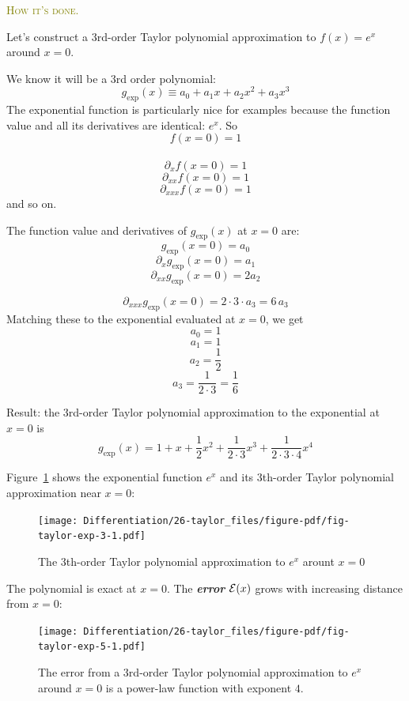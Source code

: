 \documentclass[
  letterpaper,
  DIV=11,
  numbers=noendperiod,
  oneside]{scrreprt}
\newenvironment{practice}%
{%
\textcolor{olive}{\hrulefill}%
  \par\vspace{.3\baselineskip}%
  \textcolor{olive}{\scshape How it's done.}%
  \par\vspace{\baselineskip}%
}%
{\textcolor{olive}{\hrulefill}}
\begin{document}
\begin{practice}
Let's construct a 3rd-order Taylor polynomial approximation to
\(f(x) = e^x\) around \(x=0\).

We know it will be a 3rd order polynomial:
\[g_{\exp}(x) \equiv a_0 + a_1 x + a_2 x^2 + a_3 x^3\] The exponential
function is particularly nice for examples because the function value
and all its derivatives are identical: \(e^x\). So \[f(x= 0) = 1\]\\
\[ \partial_x f(x=0) = 1\] \[\partial_{xx} f(x=0) = 1\]
\[\partial_{xxx} f(x=0) = 1\] and so on.

The function value and derivatives of \(g_{\exp}(x)\) at \(x=0\) are:
\[g_{\exp}(x=0) = a_0\] \[\partial_{x}g_{\exp}(x=0) = a_1\]
\[\partial_{xx}g_{\exp}(x=0) = 2 a_2\]

\[\partial_{xxx}g_{\exp}(x=0) = 2\cdot3\cdot a_3 = 6\, a_3\] Matching
these to the exponential evaluated at \(x=0\), we get \[a_0 = 1\]
\[a_1 = 1\] \[a_2 = \frac{1}{2}\]
\[a_3 = \frac{1}{2 \cdot 3} = \frac{1}{6}\]

Result: the 3rd-order Taylor polynomial approximation to the exponential
at \(x=0\) is
\[g_{\exp}(x) = 1 + x + \frac{1}{2} x^2 +  \frac{1}{2\cdot 3} x^3 +\frac{1}{2\cdot 3\cdot 4} x^4\]

Figure~\ref{fig-taylor-exp-3} shows the exponential function \(e^x\) and
its 3th-order Taylor polynomial approximation near \(x=0\):

\begin{figure}

{\centering \texttt{[image: Differentiation/26-taylor\_files/figure-pdf/fig-taylor-exp-3-1.pdf]}

}

\caption{\label{fig-taylor-exp-3}The 3th-order Taylor polynomial
approximation to \(e^x\) arount \(x=0\)}

\end{figure}

The polynomial is exact at \(x=0\). The \textbf{\emph{error}}
\({\cal E}(x)\) grows with increasing distance from \(x=0\):

\begin{figure}

{\centering \texttt{[image: Differentiation/26-taylor\_files/figure-pdf/fig-taylor-exp-5-1.pdf]}

}

\caption{\label{fig-taylor-exp-5-1}The error from a 3rd-order Taylor
polynomial approximation to \(e^x\) around \(x=0\) is a power-law
function with exponent \(4\).}


\end{figure}
\end{practice}
\end{document}

